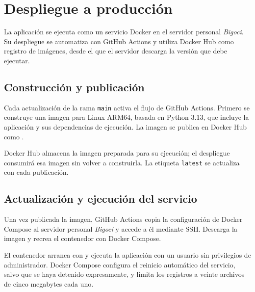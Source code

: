 \chapter{Despliegue a producción}

La aplicación se ejecuta como un servicio Docker en el servidor personal \emph{Bigoci}. Su despliegue se
automatiza con GitHub Actions y utiliza Docker Hub como registro de imágenes,
desde el que el servidor descarga la versión que debe ejecutar.

\section{Construcción y publicación}

Cada actualización de la rama \texttt{main} activa el flujo de GitHub Actions.
Primero se construye una imagen para Linux ARM64, basada en Python 3.13, que
incluye la aplicación y sus dependencias de ejecución. La imagen se publica
en Docker Hub como .

Docker Hub almacena la imagen preparada para su ejecución; el despliegue
consumirá esa imagen sin volver a construirla. La etiqueta \texttt{latest} se
actualiza con cada publicación.

\section{Actualización y ejecución del servicio}

Una vez publicada la imagen, GitHub Actions copia la configuración de Docker
Compose al servidor personal \emph{Bigoci} y accede a él mediante SSH.
Descarga la imagen y recrea el contenedor con Docker Compose.

El contenedor arranca con  y ejecuta la aplicación
con un usuario sin privilegios de administrador. Docker Compose configura el
reinicio automático del servicio, salvo que se haya detenido expresamente,
y limita los registros a veinte archivos de cinco megabytes cada uno.
